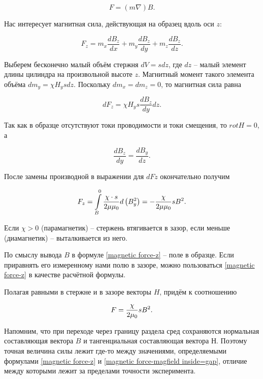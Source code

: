 \begin{equation*}
F = (m\nabla)B.
\end{equation*}

Нас интересует магнитная сила, действующая на образец вдоль оси $z$:

\begin{equation*}
F_z = m_x \frac{dB_z}{dx} + m_y \frac{dB_z}{dy} + m_z \frac{dB_z}{dz}.
\end{equation*}

Выберем бесконечно малый объём стержня $dV = sdz$, где $dz$ -- малый элемент длины цилиндра на произвольной высоте $z$. Магнитный момент такого элемента объёма $dm_y = \chi H_y s dz$. Поскольку $dm_x = dm_z = 0$, то магнитная сила равна

\begin{equation*}
dF_z = \chi H_y s \frac{dB_z}{dy} dz.
\end{equation*}

Так как в образце отсутствуют токи проводимости и токи смещения, то $rot H = 0$, а

\begin{equation*}
\frac{dB_z}{dy} = \frac{dB_y}{dz}.
\end{equation*}

После замены производной в выражении для $dFz$ окончательно получим

\begin{equation}
\eqmark{magnetic force-z}
F_z = \int\limits_B^0 \frac{\chi\cdot s}{2\mu \mu_0}d\left( B_y^2 \right) = - \frac{\chi}{2\mu \mu_0} sB^2.
\end{equation}

Если $\chi > 0$ (парамагнетик) -- стержень втягивается в зазор, если меньше (диамагнетик) -- выталкивается из него.

По смыслу вывода $B$ в формуле \eqref{magnetic force-z} -- поле в образце. Если приравнять его измеренному нами полю в зазоре, можно пользоваться \eqref{magnetic force-z} в качестве расчётной формулы.

Полагая равными в стержне и в зазоре векторы $H$, придём к соотношению

\begin{equation}
\eqmark{magnetic force-magfield inside gap}
F = \frac{\chi}{2\mu_0} sB^2.
\end{equation}

Напомним, что при переходе через границу раздела сред сохраняются нормальная составляющая вектора $B$ и тангенциальная составляющая вектора $Н$. Поэтому точная величина силы лежит где-то между значениями, определяемыми формулами \eqref{magnetic force-z} и \eqref{magnetic force-magfield inside=gap}, отличие между которыми лежит за пределами точности эксперимента.

